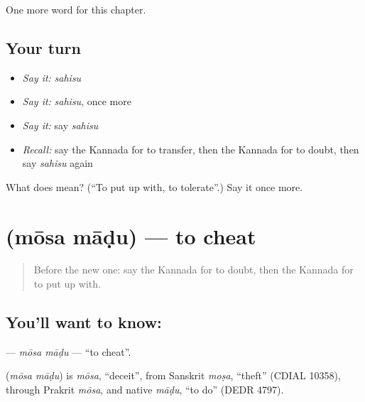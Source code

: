 \begin{grammarlens}[title={What you've built}]
One more word for this chapter.
\end{grammarlens}

\subsection*{Your turn}
\begin{itemize}
\raggedright
  \item \emph{Say it:} \emph{sahisu}
  \item \emph{Say it:} \emph{sahisu}, once more
  \item \emph{Say it:} say \emph{sahisu}
  \item \emph{Recall:} say the Kannada for to transfer, then the Kannada for to doubt, then say \emph{sahisu} again
\end{itemize}

\begin{tcolorbox}[breakable,colback=teal!4,colframe=teal!35!black,title={Before you move on}]
What does  mean? (\textquotedblleft{}To put up with, to tolerate\textquotedblright{}.) Say it once more.
\end{tcolorbox}
\section[\texorpdfstring{\kn{ಮೋಸ} \kn{ಮಾಡು} (mōsa māḍu)}{ಮೋಸ ಮಾಡು (mōsa māḍu)}]{  (mōsa māḍu) — to cheat}

\label{lesson:KA-C163-mosa-madu}



\begin{quote}
Before the new one: say the Kannada for to doubt, then the Kannada for to put up with.
\end{quote}

\subsection*{You'll want to know:  }
\textbf{ } — \emph{mōsa māḍu} — \textquotedblleft{}to cheat\textquotedblright{}.

\begin{cousinweb}
\textbf{ } (\emph{mōsa māḍu}) is \emph{mōsa}, \textquotedblleft{}deceit\textquotedblright{}, from Sanskrit \emph{moṣa}, \textquotedblleft{}theft\textquotedblright{} (CDIAL 10358), through Prakrit \emph{mōsa}, and native \emph{māḍu}, \textquotedblleft{}to do\textquotedblright{} (DEDR 4797).
\end{cousinweb}

